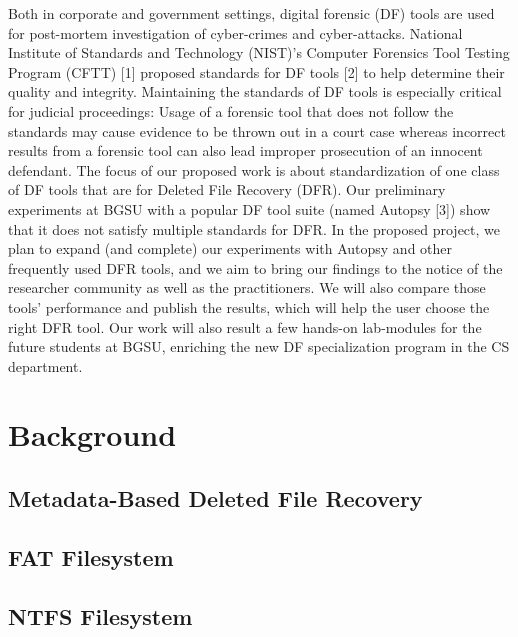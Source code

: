 \documentclass{mcurcsm}
\begin{document}
Both in corporate and government settings, digital forensic (DF) tools are used for post-mortem investigation of cyber-crimes and cyber-attacks. National Institute of Standards and Technology (NIST)’s Computer Forensics Tool Testing Program (CFTT) [1] proposed standards for DF tools [2] to help determine their quality and integrity. Maintaining the standards of DF tools is especially critical for judicial proceedings: Usage of a forensic tool that does not follow the standards may cause evidence to be thrown out in a court case whereas incorrect results from a forensic tool can also lead improper prosecution of an innocent defendant. The focus of our proposed work is about standardization of one class of DF tools that are for Deleted File Recovery (DFR). Our preliminary experiments at BGSU with a popular DF tool suite (named Autopsy [3]) show that it does not satisfy multiple standards for DFR. In the proposed project, we plan to expand (and complete) our experiments with Autopsy and other frequently used DFR tools, and we aim to bring our findings to the notice of the researcher community as well as the practitioners. We will also compare those tools’ performance and publish the results, which will help the user choose the right DFR tool. Our work will also result a few hands-on lab-modules for the future students at BGSU, enriching the new DF specialization program in the CS department.

\section{Background}

\subsection{Metadata-Based Deleted File Recovery}

\subsection{FAT Filesystem}

\subsection{NTFS Filesystem}
\end{document}
